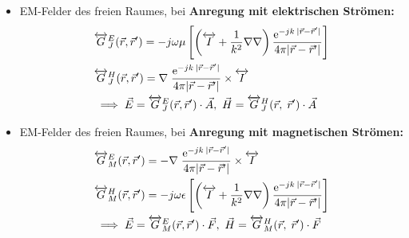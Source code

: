 {\begin{itemize}
\begin{align*}
            &\dyade{G}^A(\vec{r},\vec{r}^\prime) = \mu\dfrac{\mathrm{e}^{-jk\:|\vec{r} - \vec{r}^\prime|}}{4\pi|\vec{r} - \vec{r}^\prime|}\dyade{I},\\
            &\dyade{G}^F(\vec{r},\vec{r}^\prime) = \epsilon\dfrac{\mathrm{e}^{-jk\:|\vec{r} - \vec{r}^\prime|}}{4\pi|\vec{r} - \vec{r}^\prime|}\dyade{I}
        \end{align*}
    \item EM-Felder des freien Raumes, bei \textbf{Anregung mit elektrischen Strömen:}\\
        \begin{align*}
            &\overleftrightarrow{G}^E_J(\vec{r},\vec{r}^\prime) = -j\omega\mu\left[\left(\overleftrightarrow{I} + \dfrac{1}{k^2}\nabla\nabla\right) \dfrac{\mathrm{e}^{-jk\:|\vec{r} - \vec{r}^\prime|}}{4\pi|\vec{r} - \vec{r}^\prime|}\right]\\
            &\overleftrightarrow{G}^H_J(\vec{r},\vec{r}^\prime) = \nabla\;\dfrac{\mathrm{e}^{-jk\:|\vec{r} - \vec{r}^\prime|}}{4\pi|\vec{r} - \vec{r}^\prime|} \times \overleftrightarrow{I}\\
            &\implies \vec{E} = \overleftrightarrow{G}^E_J(\vec{r},\vec{r}^\prime) \cdot \vec{A},\
            \vec{H} = \overleftrightarrow{G}^H_J(\vec{r},\; \vec{r}^\prime) \cdot \vec{A}
        \end{align*}
    \item EM-Felder des freien Raumes, bei \textbf{Anregung mit magnetischen Strömen:}\\
        \begin{align*}
            &\overleftrightarrow{G}^E_M(\vec{r},\vec{r}^\prime) = -\nabla\;\dfrac{\mathrm{e}^{-jk\:|\vec{r} - \vec{r}^\prime|}}{4\pi|\vec{r} - \vec{r}^\prime|} \times \overleftrightarrow{I}\\
            &\overleftrightarrow{G}^H_M(\vec{r},\vec{r}^\prime) = -j\omega\epsilon\left[\left(\overleftrightarrow{I} + \dfrac{1}{k^2}\nabla\nabla\right) \dfrac{\mathrm{e}^{-jk\:|\vec{r} - \vec{r}^\prime|}}{4\pi|\vec{r} - \vec{r}^\prime|}\right]\\
            &\implies \vec{E} = \overleftrightarrow{G}^E_M(\vec{r},\vec{r}^\prime) \cdot \vec{F},\
            \vec{H} = \overleftrightarrow{G}^H_M(\vec{r},\; \vec{r}^\prime) \cdot \vec{F}
        \end{align*}

\end{itemize}
}
